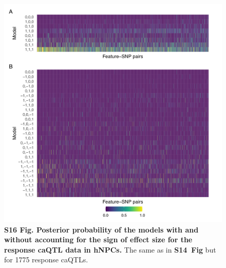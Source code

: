 \documentclass[11pt]{article}
\newcommand{\sfigwntrnahm}{\textbf{S14~Fig}\xspace}
\begin{document}
\begin{figure}[!ht]
\begin{center}
  \includegraphics[width=1\textwidth]{png/wntatac_hm.png}
\end{center}  
\caption{
  {\bf
    S16 Fig.
    Posterior probability of the models with and without accounting for the sign of effect size for the response caQTL data in hNPCs.}
The same as in \sfigwntrnahm but for 1775 response caQTLs. 
}
\label{s-fig:wntatac-sign}
\end{figure}
\end{document}
